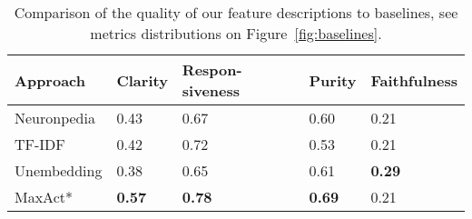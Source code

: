\begin{table}[t]
\scriptsize
\centering
\begin{tabular}{p{1.4cm}p{1cm}p{1cm}p{1cm}p{1cm}} 
Approach &   Clarity     & Respon-siveness & Purity        & Faithfulness \\ \hline \hline 
Neuronpedia  &    0.43       &   0.67          &  0.60         &  0.21   \\%
TF-IDF       &    0.42       &   0.72          &  0.53         &  0.21   \\%
Unembedding  &    0.38       &   0.65          &  0.61         &  \textbf{0.29}   \\%
MaxAct* &    \textbf{0.57}       &   \textbf{0.78 }         &  \textbf{0.69 }        &  0.21  \\ \hline 
\end{tabular}
\caption{Comparison of the quality of our feature descriptions to baselines, see metrics distributions on Figure~\ref{fig:baselines}. }
\label{tab:baselines-gemmascope}
\end{table}